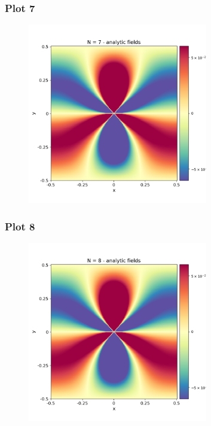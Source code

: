 \documentclass{beamer}
\begin{document}
\begin{frame}
    \frametitle{Plot 7}
    \begin{figure}[H]
        \centering
        \includegraphics[width=0.7\textwidth]{../stress_field_07.png}
    \end{figure}
\end{frame}

\begin{frame}
    \frametitle{Plot 8}
    \begin{figure}[H]
        \centering
        \includegraphics[width=0.7\textwidth]{../stress_field_08.png}
    \end{figure}
\end{frame}
\end{document}
